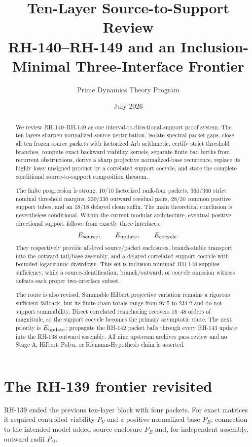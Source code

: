 \documentclass[12pt]{article}
\title{Ten-Layer Source-to-Support Review\\\large RH-140--RH-149 and an Inclusion-Minimal Three-Interface Frontier}
\author{Prime Dynamics Theory Program}
\date{July 2026}
\begin{document}
\maketitle

\begin{abstract}
We review RH-140--RH-149 as one interval-to-directional-support proof system.
The ten layers sharpen normalized source perturbation, isolate spectral packet
gaps, close all ten frozen source packets with factorized Arb arithmetic,
certify strict threshold branches, compute exact backward viability kernels,
separate finite bad births from recurrent obstructions, derive a sharp
projective normalized-base recurrence, replace its highly lossy unsigned
product by a correlated support cocycle, and state the complete conditional
source-to-support composition theorem.

The finite progression is strong: 10/10 factorized rank-four packets,
360/360 strict nominal threshold margins, 330/330 outward residual pairs,
28/30 common positive support tubes, and an 18/18 delayed clean suffix.  The
main theoretical conclusion is nevertheless conditional.  Within the current
modular architecture, eventual positive directional support follows from
exactly three interfaces:
\[
 E_{\rm source},\qquad E_{\rm update},\qquad E_{\rm cocycle}.
\]
They respectively provide all-level source/packet enclosures, branch-stable
transport into the outward tail/base assembly, and a delayed correlated
support cocycle with bounded logarithmic drawdown.  This set is
inclusion-minimal: RH-148 supplies sufficiency, while a source-identification,
branch/outward, or cocycle omission witness defeats each proper two-interface
subset.

The route is also revised.  Summable Hilbert projective variation remains a
rigorous sufficient fallback, but its finite chain totals range from $97.5$
to $234.2$ and do not support summability.  Direct correlated reanchoring
recovers 16--48 orders of magnitude, so the support cocycle becomes the
primary asymptotic route.  The next priority is $E_{\rm update}$: propagate
the RH-142 packet balls through every RH-143 update into the RH-138 outward
assembly.  All nine upstream archives pass review and no Stage A,
Hilbert--Polya, or Riemann-Hypothesis claim is asserted.
\end{abstract}

\section{The RH-139 frontier revisited}
RH-139 ended the previous ten-layer block with four packets.  For exact
matrices it required controlled viability $P_V$ and a positive normalized
base $P_B$; connection to the intended model added source enclosure $P_E$
and, for independent assembly, outward radii $P_O$.
\end{document}

